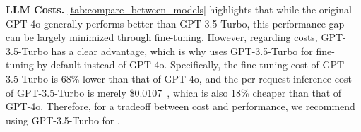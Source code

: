\noindent
\textbf{LLM Costs.}
\mytab\ref{tab:compare_between_models} highlights that while the original GPT-4o generally performs better than GPT-3.5-Turbo, this performance gap can be largely minimized through fine-tuning.
However, regarding costs, GPT-3.5-Turbo has a clear advantage, which is why \name uses GPT-3.5-Turbo for fine-tuning by default instead of GPT-4o.
Specifically, the fine-tuning cost of GPT-3.5-Turbo is 68\% lower than that of GPT-4o, and the per-request inference cost of GPT-3.5-Turbo is merely \$0.0107~\cite{OpenAI_Price}, which is also 18\% cheaper than that of GPT-4o.
Therefore, for a tradeoff between cost and performance, we recommend using GPT-3.5-Turbo for \name.







